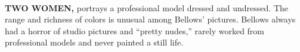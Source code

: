 \begin{minipage}{1.05\textwidth}
\\[-27.5pt]
\setlength{\linewidth}{.95\textwidth}
\setlength{\columnsep}{8pt}
\begin{multicols}{2}
\noindent \footnotesize\textbf{TWO WOMEN,} portrays a professional model dressed and undressed. The range and richness of colors is unusual among Bellows' pictures. Bellows always had a horror of studio pictures and ``pretty nudes,'' rarely worked from professional models and never painted a still life.
\end{multicols}
\vfill

\end{minipage}

\newcommand\articleheading[1]{%
    \par
    \vspace*{2\baselineskip}
    \bgroup
    \LARGE\bf\textsf{\noindent #1}
    \egroup
   \vskip2\baselineskip
}
\clearpage

